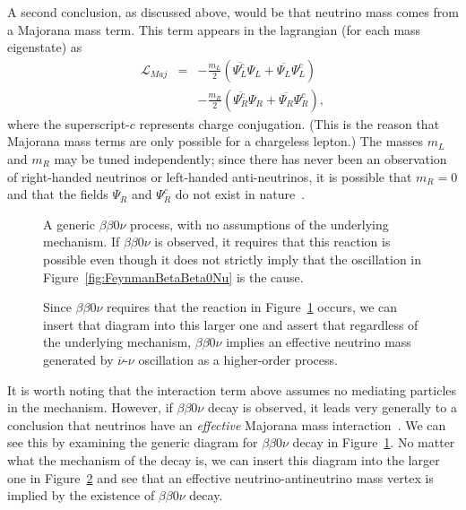A second conclusion, as discussed above, would be that neutrino mass comes from a Majorana mass term.  This term appears in the lagrangian (for each mass eigenstate) as 
\begin{eqnarray*}
\mathcal{L}_{Maj}&=& -\frac{m_{L}}{2} \left( \overline{\Psi_L^c} \Psi_L^{} + \overline{\Psi_L^{}} \Psi_L^c \right)\\
                 & & -\frac{m_{R}}{2} \left( \overline{\Psi_R^c} \Psi_R^{} + \overline{\Psi_R^{}} \Psi_R^c \right),
\end{eqnarray*}
where the superscript-$c$ represents charge conjugation.  (This is the reason that Majorana mass terms are only possible for a chargeless lepton.)  The masses $m_L$ and $m_R$ may be tuned independently; since there has never been an observation of right-handed neutrinos or left-handed anti-neutrinos, it is possible that $m_R = 0$ and that the fields $\Psi_R^{}$ and $\Psi_R^c$ do not exist in nature~\cite{PDG}.

\begin{figure}
\caption{A generic $\beta\beta 0\nu$ process, with no assumptions of the underlying mechanism.  If $\beta\beta 0\nu$ is observed, it requires that this reaction is possible even though it does not strictly imply that the oscillation in Figure~\ref{fig:FeynmanBetaBeta0Nu} is the cause.}
\label{fig:FeynmanBetaBeta0NuBlob}
\end{figure}

\begin{figure}
\caption{Since $\beta\beta 0\nu$ requires that the reaction in Figure~\ref{fig:FeynmanBetaBeta0NuBlob} occurs, we can insert that diagram into this larger one and assert that regardless of the underlying mechanism, $\beta\beta 0\nu$ implies an effective neutrino mass generated by $\overline{\nu}$-$\nu$ oscillation as a higher-order process.}
\label{fig:FeynmanBetaBeta0NuImplication}
\end{figure}

It is worth noting that the interaction term above assumes no mediating particles in the mechanism.  However, if $\beta\beta 0\nu$ decay is observed, it leads very generally to a conclusion that neutrinos have an \emph{effective} Majorana mass interaction~\cite{BlackBoxTheorem}.  We can see this by examining the generic diagram for $\beta\beta 0\nu$ decay in Figure~\ref{fig:FeynmanBetaBeta0NuBlob}.  No matter what the mechanism of the decay is, we can insert this diagram into the larger one in Figure~\ref{fig:FeynmanBetaBeta0NuImplication} and see that an effective neutrino-antineutrino mass vertex is implied by the existence of $\beta\beta 0\nu$ decay.


